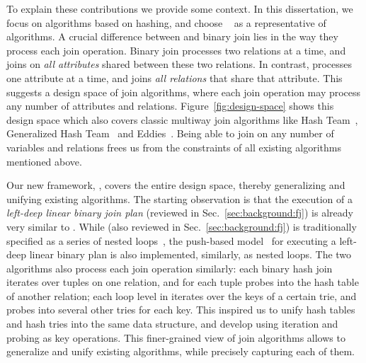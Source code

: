 To explain these contributions we provide some context.
%
In this dissertation, we focus on algorithms based on hashing,
  and choose \GJ~\cite{DBLP:journals/sigmod/NgoRR13} as a representative of \WCOJ algorithms.
A crucial difference between \GJ and binary join lies 
  in the way they process each join operation. 
Binary join processes two relations at a time, 
  and joins on \emph{all attributes} 
  shared between these two relations. 
In contrast, \GJ processes one attribute at a time, 
  and joins \emph{all relations} that share that attribute.
This suggests a design space of join algorithms, 
  where each join operation may process any 
  number of attributes and relations.
Figure~\ref{fig:design-space} shows this design space
  which also covers classic multiway join algorithms 
  like Hash Team~\cite{DBLP:conf/vldb/GraefeBC98}, 
  Generalized Hash Team~\cite{DBLP:conf/vldb/KemperKW99}
  and Eddies~\cite{DBLP:conf/sigmod/HellersteinA00}.
Being able to join on any number of variables and relations
  frees us from the constraints of all existing algorithms 
  mentioned above. 

Our new framework, \FJ,
  covers the entire design space, 
  thereby generalizing and unifying existing algorithms.
The starting observation is that the execution of a {\em left-deep linear 
  binary join plan} (reviewed in Sec.~\ref{sec:background:fj}) is already very similar to \GJ.
While \GJ (also reviewed in Sec.~\ref{sec:background:fj}) is traditionally specified as a series of nested loops~\cite{DBLP:journals/sigmod/NgoRR13},
  the push-based model~\cite{DBLP:journals/pvldb/Neumann11,DBLP:journals/pvldb/KerstenLKNPB18} for executing a left-deep linear binary plan
  is also implemented, similarly, as nested loops.
The two algorithms also process each join operation similarly:
  each binary hash join iterates over tuples on one relation, 
  and for each tuple probes into the hash table of another relation;
  each loop level in \GJ iterates over the keys of a certain trie,
  and probes into several other tries for each key.
This inspired us to unify hash tables and hash tries into the same data structure, 
  and develop \FJ using iteration and probing as key operations.
This finer-grained view of join algorithms allows \FJ
  to generalize and unify existing algorithms,
  while precisely capturing each of them.


